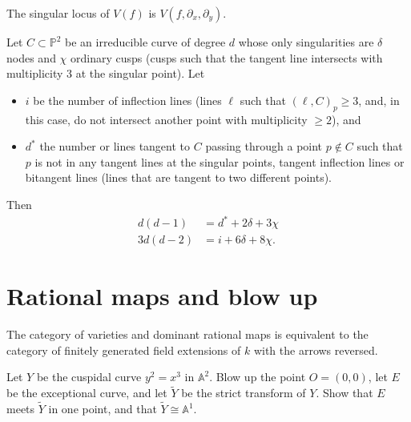 \documentclass{book}
\begin{document}
\noindent
\begin{proposition}
\label{proposition-jacobian-criterion}
The singular locus of $V(f)$ is
$V(f,\partial_x,\partial_y)$.
\end{proposition}



\begin{theorem}
\label{theorem-plucker-formulas} Let $C
\subset \mathbb{P}^2$ be an irreducible curve
of degree $d$ whose only singularities are
$\delta$ nodes and $\chi$ ordinary cusps
(cusps such that the tangent line intersects
with multiplicity 3 at the singular point).
Let \begin{itemize} \item $i$ be the number
of inflection lines (lines $\ell$ such that
$(\ell,C)_p \geq 3$, and, in this case, do
not intersect another point with multiplicity
$\geq 2$), and

\item $d^*$ the number or lines tangent to
$C$ passing through a point $p \not\in C$
such that $p$ is not in any tangent lines at
the singular points, tangent inflection lines
or bitangent lines (lines that are tangent to
two different points). \end{itemize}

\noindent Then $$
\begin{aligned}
d(d-1)&=d^*+2\delta+3\chi\\
3d(d-2)&=i+6\delta+8\chi. \end{aligned}
$$
\end{theorem}

\section{Rational maps and blow up}
\label{section-rational-maps-and-blow-up}

\noindent
The category of varieties and dominant
rational maps is equivalent to the category
of finitely generated field extensions of $k$
with the arrows reversed.

\begin{exercise}
\label{exercise-cuspidal-curve-blow-up}
Let $Y$ be the cuspidal curve $y^2=x^3$ in
$\mathbb{A}^2$.
Blow up the point $O=(0,0)$, let $E$ be the
exceptional curve,
and let $\tilde{Y}$ be the strict transform
of $Y$.
Show that $E$ meets $\tilde{Y}$ in one point,
and that $\tilde{Y} \cong \mathbb{A}^1$.
\end{exercise}
\end{document}
